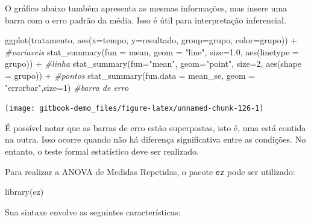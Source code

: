 \documentclass[
]{book}
\newenvironment{Shaded}{\begin{snugshade}}{\end{snugshade}}
\newcommand{\AttributeTok}[1]{\textcolor[rgb]{0.77,0.63,0.00}{#1}}
\newcommand{\CommentTok}[1]{\textcolor[rgb]{0.56,0.35,0.01}{\textit{#1}}}
\newcommand{\DecValTok}[1]{\textcolor[rgb]{0.00,0.00,0.81}{#1}}
\newcommand{\FloatTok}[1]{\textcolor[rgb]{0.00,0.00,0.81}{#1}}
\newcommand{\FunctionTok}[1]{\textcolor[rgb]{0.00,0.00,0.00}{#1}}
\newcommand{\NormalTok}[1]{#1}
\newcommand{\SpecialCharTok}[1]{\textcolor[rgb]{0.00,0.00,0.00}{#1}}
\newcommand{\StringTok}[1]{\textcolor[rgb]{0.31,0.60,0.02}{#1}}
\begin{document}
O gráfico abaixo também apresenta as mesmas informações, mas insere uma barra com o erro padrão da média. Isso é útil para interpretação inferencial.

\begin{Shaded}
\begin{Highlighting}[]
\FunctionTok{ggplot}\NormalTok{(tratamento, }\FunctionTok{aes}\NormalTok{(}\AttributeTok{x=}\NormalTok{tempo, }\AttributeTok{y=}\NormalTok{resultado, }
                       \AttributeTok{group=}\NormalTok{grupo, }\AttributeTok{color=}\NormalTok{grupo)) }\SpecialCharTok{+} \CommentTok{\#variaveis}
  \FunctionTok{stat\_summary}\NormalTok{(}\AttributeTok{fun =}\NormalTok{ mean, }\AttributeTok{geom =} \StringTok{"line"}\NormalTok{, }
               \AttributeTok{size=}\FloatTok{1.0}\NormalTok{, }\FunctionTok{aes}\NormalTok{(}\AttributeTok{linetype =}\NormalTok{ grupo)) }\SpecialCharTok{+} \CommentTok{\#linha}
  \FunctionTok{stat\_summary}\NormalTok{(}\AttributeTok{fun=}\StringTok{"mean"}\NormalTok{, }\AttributeTok{geom=}\StringTok{"point"}\NormalTok{, }
               \AttributeTok{size=}\DecValTok{2}\NormalTok{, }\FunctionTok{aes}\NormalTok{(}\AttributeTok{shape =}\NormalTok{ grupo)) }\SpecialCharTok{+} \CommentTok{\#pontos}
  \FunctionTok{stat\_summary}\NormalTok{(}\AttributeTok{fun.data =}\NormalTok{ mean\_se, }
               \AttributeTok{geom =} \StringTok{"errorbar"}\NormalTok{,}\AttributeTok{size=}\DecValTok{1}\NormalTok{) }\CommentTok{\#barra de erro}
\end{Highlighting}
\end{Shaded}

\begin{center}\texttt{[image: gitbook-demo\_files/figure-latex/unnamed-chunk-126-1]} \end{center}

É possível notar que as barras de erro estão superpostas, isto é, uma está contida na outra. Isso ocorre quando não há diferença significativa entre as condições. No entanto, o teste formal estatístico deve ser realizado.

Para realizar a ANOVA de Medidas Repetidas, o pacote \texttt{ez} pode ser utilizado:

\begin{Shaded}
\begin{Highlighting}[]
\FunctionTok{library}\NormalTok{(ez)}
\end{Highlighting}
\end{Shaded}

Sua sintaxe envolve as seguintes características:
\end{document}
